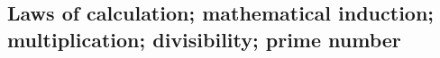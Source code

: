 \paragraph{} %

\paragraph{} %

\paragraph{} %

\paragraph{} %

\paragraph{} %

\subsection[Laws of calculation]{Laws of calculation; mathematical induction; multiplication; divisibility; prime number}

\paragraph{} %

\paragraph{} %

\paragraph{} %

\paragraph{} %

\paragraph{} %

\paragraph{} %

